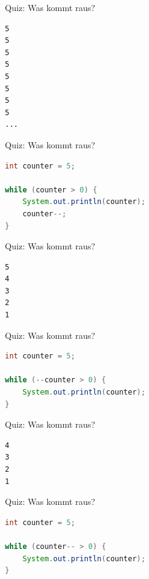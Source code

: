 \documentclass[18pt]{beamer}
\begin{document}
\begin{frame}[fragile]{Quiz: Was kommt raus?}
    \begin{block}{}
        \begin{lstlisting}
5
5
5
5
5
5
5
5
...
        \end{lstlisting}
    \end{block}
\end{frame}
\begin{frame}[fragile]{Quiz: Was kommt raus?}
    \begin{exampleblock}{}
        \begin{lstlisting}[language=Java]
int counter = 5;

while (counter > 0) {
    System.out.println(counter);
    counter--;
}
        \end{lstlisting}
    \end{exampleblock}
\end{frame}

\begin{frame}[fragile]{Quiz: Was kommt raus?}
    \begin{block}{}
        \begin{lstlisting}
5
4
3
2
1
        \end{lstlisting}
    \end{block}
\end{frame}
\begin{frame}[fragile]{Quiz: Was kommt raus?}
    \begin{exampleblock}{}
        \begin{lstlisting}[language=Java]
int counter = 5;

while (--counter > 0) {
    System.out.println(counter);
}
        \end{lstlisting}
    \end{exampleblock}
\end{frame}

\begin{frame}[fragile]{Quiz: Was kommt raus?}
    \begin{block}{}
        \begin{lstlisting}
4
3
2
1
        \end{lstlisting}
    \end{block}
\end{frame}
\begin{frame}[fragile]{Quiz: Was kommt raus?}
    \begin{exampleblock}{}
        \begin{lstlisting}[language=Java]
int counter = 5;

while (counter-- > 0) {
    System.out.println(counter);
}
        \end{lstlisting}
    \end{exampleblock}
\end{frame}
\end{document}

